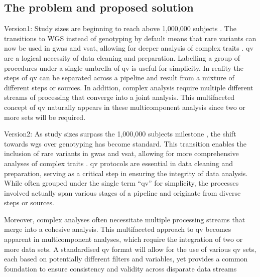 \subsection{The problem and proposed solution}

Version1:
Study sizes are beginning to reach above 1,000,000 subjects
\cite{lee2018gene, jansen2019genome}.
The transitions to WGS instead of genotyping by default means that rare variants can now be used in \ac{gwas} and \ac{vsat}, allowing for deeper analysis of complex traits
\cite{manolio2009finding, young2019solving}. %
\ac{qv} are a logical necessity of data cleaning and preparation. 
Labelling a group of procedures under a single umbrella of \ac{qv} is useful for simplicity. 
In reality the steps of \ac{qv} can be separated across a pipeline and result from a mixture of different steps or sources. 
In addition, complex analysis require multiple different streams of processing that converge into a joint analysis.
This multifaceted concept of \ac{qv} naturally appears in these multicomponent analysis since two or more sets will be required.


Version2: 
As study sizes surpass the 1,000,000 subjects milestone \cite{lee2018gene, jansen2019genome}, the shift towards \ac{wgs} over genotyping has become standard. 
This transition enables the inclusion of rare variants in \ac{gwas} and \ac{vsat}, allowing for more comprehensive analyses of complex traits \cite{manolio2009finding, young2019solving}. 
\ac{qv} protocols are essential in data cleaning and preparation, serving as a critical step in ensuring the integrity of data analysis. 
While often grouped under the single term ``\ac{qv}'' for simplicity, the processes involved actually span various stages of a pipeline and originate from diverse steps or sources.

Moreover, complex analyses often necessitate multiple processing streams that merge into a cohesive analysis. 
This multifaceted approach to \ac{qv} becomes apparent in multicomponent analyses, which require the integration of two or more data sets. 
A standardised \ac{qv} format will allow for the use of various \ac{qv} sets, each based on potentially different filters and variables, yet provides a common foundation to ensure consistency and validity across disparate data streams

